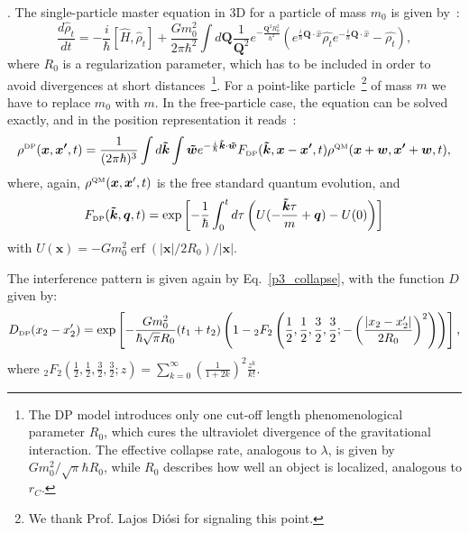 \documentclass[12pt,groupedaddress,pra,aps]{revtex4-1}
\DeclareMathOperator\erf{erf}
\begin{document}
.
\noindent The single-particle master equation in 3D for a particle
of mass $m_{0}$ is given by~\cite{PhysRevA.40.1165,PhysRevA.90.062135}:
\begin{equation}
\frac{d\hat{\rho}_{t}}{dt}=-\frac{i}{\hbar}\left[\hat{H},\hat{\rho}_{t}\right]+\frac{Gm_{0}^{2}}{2\pi\hbar^{2}}\int d\bm{Q}\frac{1}{\bm{Q}^{2}}e^{-\frac{\bm{Q}^{2}R_{0}^{2}}{\hbar^{2}}}\left(e^{\frac{i}{\hbar}\bm{Q}\cdot\hat{x}}\hat{\rho_{t}}e^{-\frac{i}{\hbar}\bm{Q}\cdot\hat{x}}-\hat{\rho_{t}}\right),\label{dp_equation}
\end{equation}
where $R_{0}$ is a regularization parameter, which has to be included
in order to avoid divergences at short distances~\footnote{The DP model introduces only one cut-off length phenomenological parameter
$R_{0}$, which cures the ultraviolet divergence of the gravitational
interaction. The effective collapse rate, analogous to $\lambda$,
is given by $Gm_{0}^{2}/\sqrt{\pi}\hbar R_{0}$, while $R_{0}$ describes
how well an object is localized, analogous to $r_{C}$.}. For a point-like particle~\footnote{We thank Prof. Lajos Di\'{o}si for signaling this point. }
of mass $m$ we have to replace $m_{0}$ with $m$. In the free-particle
case, the equation can be solved exactly, and in the position representation
it reads~\cite{PhysRevA.90.062135}: 
\begin{equation}\label{rho_grw_dp3}
\rho^{\text{\tiny DP}}(\bm{x},\bm{x'},t)= \frac{1}{(2\pi\hbar)^3} \int d\bm{\tilde{k}}  \int \bm{\tilde{w}} e^{-\frac{i}{\hbar}\bm{\tilde{k}} \cdot \bm{\tilde{w}}}
F_{\text{\tiny DP}}(\bm{\tilde{k}},\bm{x}-\bm{x'},t) \rho^{\text{\tiny QM}}(\bm{x}+\bm{w},\bm{x'}+\bm{w},t),
\end{equation}
where, again, $\rho^{\text{\tiny QM}}(\bm{x},\bm{x}',t)$ is the free standard quantum evolution, and
\begin{equation}\label{FF_dp3}
F_{\text{\tiny DP}}(\bm{\tilde{k}},\bm{q},t)= \exp\left[ -\frac{1}{\hbar}\\
\int_0^t d\tau \left(   U(-\frac{\bm{\tilde{k}} \tau}{m} +\bm{q}) - U(0) \right)  \right]
\end{equation}
with $U(\bm{x})=-G m_0^2 \erf(|\bm{x}|/2R_0)/|\bm{x}|$.

The interference pattern is given again by Eq.~\eqref{p3_collapse}, with the function $D$ given by:
\begin{equation}\label{cfunc_dp}
D_{\text{\tiny DP}}(x_2-x_2')= \exp \left[-\frac{G m_0^2 }{\hbar \sqrt{\pi} R_0} (t_1+t_2)  \left(1- {}_2F_2 \left(\frac{1}{2},\frac{1}{2},\frac{3}{2},\frac{3}{2};  -\left(\frac{|x_2-x_2'|}{2 R_0} \right)^2 \right) \right) \right],
\end{equation}
where ${}_2F_2(\frac{1}{2},\frac{1}{2},\frac{3}{2},\frac{3}{2}; z) = \sum_{k=0}^{\infty} \left( \frac{1}{1+2k}\right)^2 \frac{z^k}{k!}$.
\end{document}
